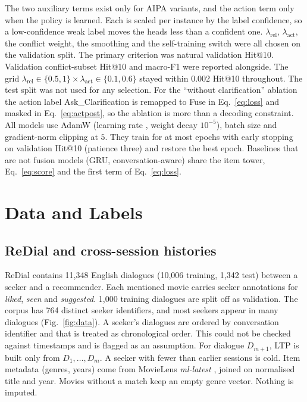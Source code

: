 The two auxiliary terms exist only for AIPA variants, and the action term only when the policy is learned. Each is scaled per instance by the label confidence, so a low-confidence weak label moves the heads less than a confident one. $\lambda_{\mathrm{rel}}$, $\lambda_{\mathrm{act}}$, the conflict weight, the smoothing and the self-training switch were all chosen on the validation split. The primary criterion was natural validation Hit@10. Validation conflict-subset Hit@10 and macro-F1 were reported alongside. The grid $\lambda_{\mathrm{rel}}\in\{0.5,1\}\times\lambda_{\mathrm{act}}\in\{0.1,0.6\}$ stayed within $0.002$ Hit@10 throughout. The test split was not used for any selection. For the ``without clarification'' ablation the action label Ask\_Clarification is remapped to Fuse in Eq.~\eqref{eq:loss} and masked in Eq.~\eqref{eq:actpost}, so the ablation is more than a decoding constraint. All models use AdamW \cite{loshchilov2019adamw} (learning rate \lr, weight decay $10^{-5}$), batch size \batchSize{} and gradient-norm clipping at $5$. They train for at most \nEpochs{} epochs with early stopping on validation Hit@10 (patience three) and restore the best epoch. Baselines that are not fusion models (GRU, conversation-aware) share the item tower, Eq.~\eqref{eq:score} and the first term of Eq.~\eqref{eq:loss}.

\section{Data and Labels}
\label{sec:data}
\subsection{ReDial and cross-session histories}
ReDial \cite{li2018redial} contains 11{,}348 English dialogues (10{,}006 training, 1{,}342 test) between a seeker and a recommender. Each mentioned movie carries seeker annotations for \emph{liked}, \emph{seen} and \emph{suggested}. 1{,}000 training dialogues are split off as validation. The corpus has 764 distinct seeker identifiers, and most seekers appear in many dialogues (Fig.~\ref{fig:data}). A seeker's dialogues are ordered by conversation identifier and that is treated as chronological order. This could not be checked against timestamps and is flagged as an assumption. For dialogue $D_{m+1}$, LTP is built only from $D_1,\dots,D_m$. A seeker with fewer than \minHist{} earlier sessions is cold. Item metadata (genres, years) come from MovieLens \emph{ml-latest} \cite{harper2015movielens}, joined on normalised title and year. Movies without a match keep an empty genre vector. Nothing is imputed.

